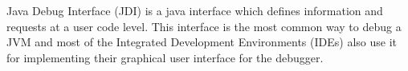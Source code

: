 \documentclass[..thesis.tex]{subfiles}
\begin{document}
Java Debug Interface (JDI) is a java interface which defines information and requests at a user code level. 
This interface is the most common way to debug a JVM and most of the Integrated Development Environments (IDEs) also use it for implementing their graphical user interface for the debugger.
\end{document}
